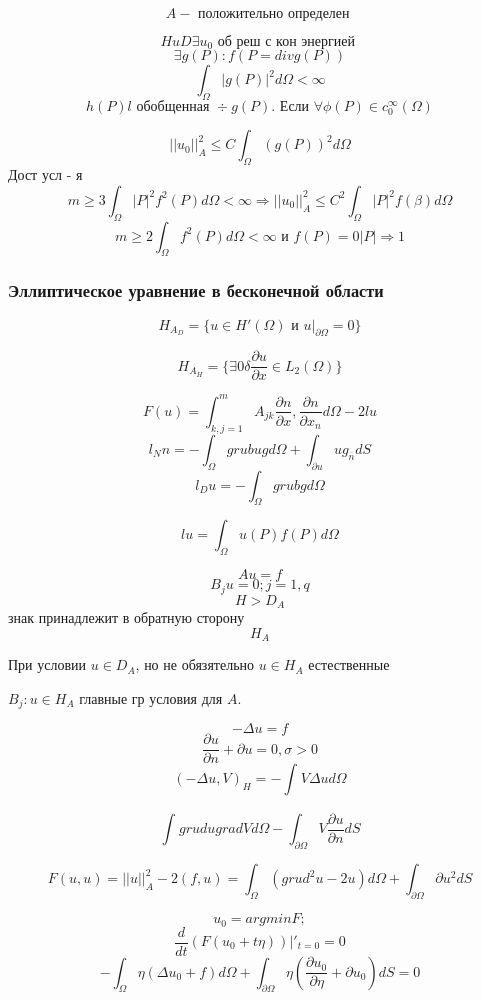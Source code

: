 \documentclass[12pt, a4paper]{article}
\begin{document}
\[ A - \textrm{ положительно определен } \]

\[ HuD \exists u_0 \textrm{ об реш с кон энергией } \]
\[ \exists g(P): f(P = div g(P)) \]
\[ \int_{\Omega}^{} {|g(P)|}^2 d\Omega < \infty \]
\[ h(P)l \textrm{ обобщенная  } \div g(P). \textrm{ Если  } \forall \phi (P) \in c_0^{\infty} (\Omega) \]

\[ {||u_0||}^2_A \leq C \int_{\Omega}^{} {(g(P))}^2 d \Omega \]
Дост усл - я
\[ m \geq 3 \int_{\Omega}^{} |P|^2 f^2 (P) d\Omega < \infty \Rightarrow {||u_0||}_A^2 \leq C^2 \int_{\Omega}^{}{|P|}^2 f (\beta)d\Omega \]
\[ m \geq 2 \int_{\Omega}^{} f^2 (P) d\Omega < \infty \textrm{ и } f(P)= 0 |P| \Rightarrow 1\]

\subsubsection{ Эллиптическое уравнение в бесконечной области}

\[ H_{A_D} = \{ u \in H' (\Omega) \textrm{ и } {u|}_{\partial  \Omega} = 0 \} \]

\[ H_{A_H} = \{ \exists 0 \delta \frac{\partial u}{\partial x} \in L_2(\Omega) \} \]

\[ F(u) = \int_{k, j=1}^{m} A_{jk} \frac{\partial n}{\partial x}, \frac{\partial n}{\partial  x_n} d \Omega - 2lu \]
\[ l_N n = -\int_{\Omega}^{} grub u g d\Omega + \int_{\partial u}^{} u g_{\overline{n}} d S \]
\[ l_D u = -\int_{\Omega}^{} grub  g d\Omega \]

\[ lu = \int_{\Omega}^{} u (P) f(P) d \Omega \]

\[ Au = f \]
\[ B_ju=0; j=1,q \]
\[ H > D_A \] знак принадлежит в обратную сторону
\[ H_A \]

При условии $ u \in D_A $, но не обязятельно $ u\in H_A $ естественные

$ B_j: u \in H_A $ главные гр условия для $A$.

\[ - \Delta u = f \]
\[ \frac{\partial u}{\partial n} + \partial u = 0, \sigma > 0 \]
\[ {(- \Delta u, V)}_H = - \int_{}^{} V \Delta u d\Omega \]

\[ \int_{}^{} grud u grad V d\Omega - \int_{\partial \Omega}^{}V\frac{\partial u}{\partial n} dS \]

\[ F(u,u) = {||u||}^2_A - 2(f, u) = \int_{\Omega}^{} ({grud}^2 u - 2u) d\Omega + \int_{\partial \Omega}^{} \partial  u^2 dS \]

\[ u_0 = argmin F; \]
\[ \frac{d}{dt} (F(u_0 + t \eta))|'_{t=0} = 0 \]
\[ -\int_{\Omega}^{} \eta (\Delta u_0 + f) d\Omega + \int_{\partial \Omega}^{} \eta (\frac{\partial u_0}{\partial \eta} + \partial u_0) dS = 0 \]
\end{document}

